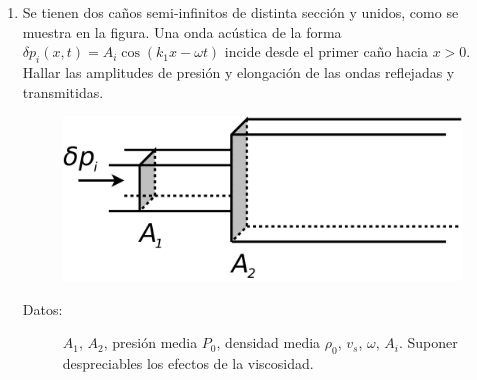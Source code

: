 \documentclass[11pt,spanish,a4paper]{article}
\begin{document}
\begin{enumerate}
\item Se tienen dos caños semi-infinitos de distinta sección y unidos,
como se muestra en la figura. Una onda acústica de la forma $\delta p_{i}(x,t)=A_{i}\cos\left(k_{1}x-\omega t\right)$
incide desde el primer caño hacia $x>0$. Hallar las amplitudes de
presión y elongación de las ondas reflejadas y transmitidas.
\begin{figure}[H]
\centering{}\includegraphics[clip,scale=0.25]{ej2-10}
\end{figure}
\begin{description}
\item [{Datos:}] $A_{1}$, $A_{2}$, presión media $P_{0}$, densidad media
$\rho_{0}$, $v_{s}$, $\omega$, $A_{i}$. Suponer despreciables
los efectos de la viscosidad.
\end{description}



\end{enumerate}
\end{document}
